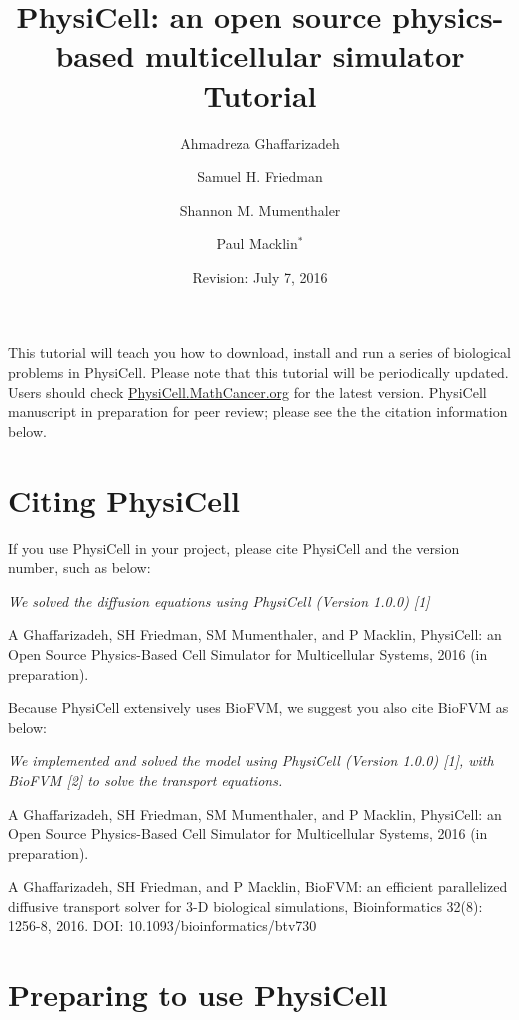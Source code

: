 \documentclass[11pt]{article}
\begin{document}
\author{Ahmadreza Ghaffarizadeh \and Samuel H. Friedman \and Shannon M. Mumenthaler \and Paul Macklin${}^*$}
\title{PhysiCell: an open source physics-based multicellular simulator
\break\break
\textbf{\huge{Tutorial}}
}
\date{}
\date{Revision: July 7, 2016}	

\maketitle
This tutorial will teach you how to download, install and run a series of biological problems in PhysiCell.
Please note that this tutorial will be periodically updated.
Users should check \href{http://PhysiCell.MathCancer.org}{PhysiCell.MathCancer.org}  for the latest version. PhysiCell manuscript in preparation for peer review;   
please see the the citation information below.

\section{Citing PhysiCell}
If you use PhysiCell in your project, please cite PhysiCell and the version  number, such as below:\\

\begin{adjustwidth}{2.5em}{0pt}
\textit{We solved the diffusion equations using PhysiCell (Version 1.0.0) [1]}

\indent [1] A Ghaffarizadeh, SH Friedman, SM Mumenthaler, and P Macklin, PhysiCell: an Open Source Physics-Based Cell Simulator for Multicellular Systems, 2016 (in preparation). 

Because PhysiCell extensively uses BioFVM, we suggest you also cite BioFVM as below:

\textit{We implemented and solved the model using PhysiCell (Version 1.0.0) [1], with BioFVM [2] to solve the transport equations.}

\indent [1] A Ghaffarizadeh, SH Friedman, SM Mumenthaler, and P Macklin, PhysiCell: an Open Source Physics-Based Cell Simulator for Multicellular Systems, 2016 (in preparation).

\indent [2] A Ghaffarizadeh, SH Friedman, and P Macklin, BioFVM: an efficient parallelized diffusive transport solver for 3-D biological simulations, Bioinformatics 32(8): 1256-8, 2016. DOI: 10.1093/bioinformatics/btv730
\end{adjustwidth}


\section{Preparing to use PhysiCell}
\end{document}

